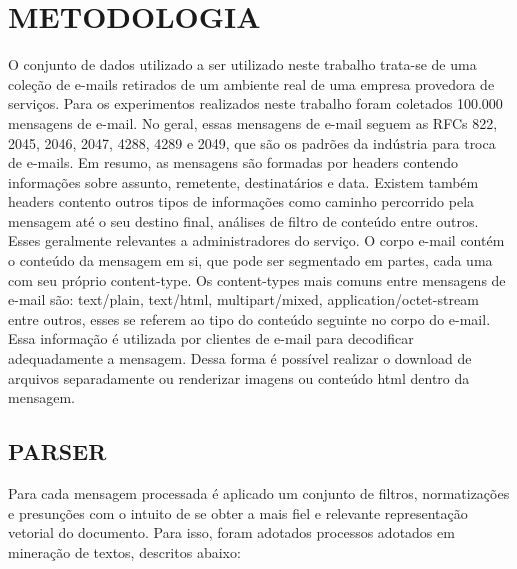 \documentclass[12pt,a4paper]{article}
\begin{document}
\section{METODOLOGIA}
O conjunto de dados utilizado a ser utilizado neste trabalho trata-se de uma coleção de e-mails retirados de um ambiente real de uma empresa provedora de serviços. 
 Para os experimentos realizados neste trabalho foram coletados 100.000 mensagens de e-mail. No geral, essas mensagens de e-mail seguem as RFCs 822, 2045, 2046, 2047, 4288, 4289 e 2049,
 que são os padrões da indústria para troca de e-mails.	Em resumo, as mensagens são formadas por headers contendo informações sobre assunto, remetente, destinatários e data.
 Existem também headers contento outros tipos de informações como caminho percorrido pela mensagem até o seu destino final, análises de filtro de conteúdo entre outros. Esses geralmente relevantes a administradores do serviço. O corpo e-mail contém o conteúdo da mensagem em si, que pode ser segmentado em  partes, cada uma com seu próprio content-type. 
 Os content-types mais comuns entre mensagens de e-mail são: text/plain, text/html, multipart/mixed, application/octet-stream entre outros, esses se referem ao tipo do conteúdo seguinte no corpo do e-mail.
 Essa informação é utilizada por clientes de e-mail para decodificar adequadamente a mensagem. Dessa forma é possível realizar o download de arquivos separadamente ou renderizar imagens ou conteúdo html dentro da mensagem.


\subsection{PARSER}
Para cada mensagem processada é aplicado um conjunto de filtros, normatizações e presunções com o intuito de se obter a mais fiel e relevante representação vetorial do documento.
 Para isso, foram adotados processos adotados em mineração de textos, descritos abaixo:
\end{document}
